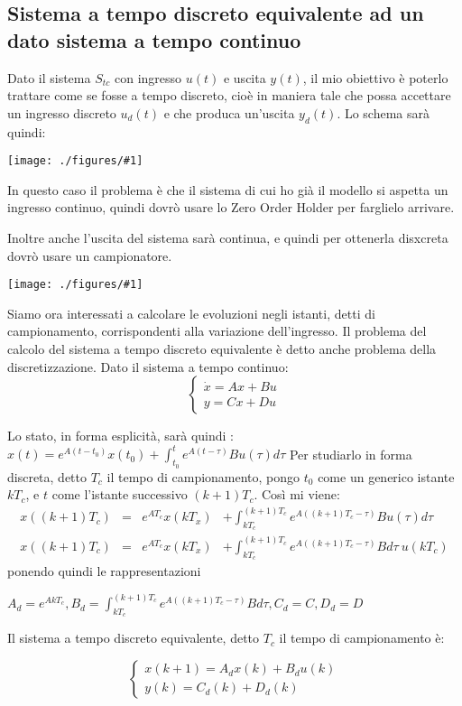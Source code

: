 \documentclass{article}
\newcommand{\incfig}[2]{%
	\texttt{[image: ./figures/\#1]}%
}
\begin{document}
\subsection{Sistema a tempo discreto equivalente ad un dato sistema a tempo continuo}
Dato il sistema $S_{tc}$ con ingresso $u(t)$ e uscita $y(t)$, il mio obiettivo è poterlo trattare come se fosse a tempo discreto, cioè in maniera tale
che possa accettare un ingresso discreto $u_d(t)$ e che produca un'uscita $y_d(t)$.
Lo schema sarà quindi:

\incfig{ZOH.jpeg}{0.4}

In questo caso il problema è che il sistema di cui ho già il modello si aspetta un ingresso continuo, quindi dovrò usare lo Zero Order Holder per
farglielo arrivare.

Inoltre anche l'uscita del sistema sarà continua, e quindi per ottenerla disxcreta dovrò usare un campionatore.

\incfig{discreto.jpeg}{0.4}

Siamo ora interessati a calcolare le evoluzioni negli istanti, detti di campionamento, corrispondenti alla variazione dell'ingresso.
Il problema del calcolo del sistema a tempo discreto equivalente è detto anche problema della discretizzazione. Dato il sistema a tempo continuo:
\[
\begin{cases}
    \dot{x} = Ax+Bu\\
    y = Cx+Du
\end{cases}
\]

Lo stato, in forma esplicità, sarà quindi : \(\displaystyle x(t) = e^{A(t-t_0)}x(t_0) + \int_{t_0}^{t} e^{A(t-\tau)}Bu(\tau)d\tau\)
Per studiarlo in forma discreta, detto $T_c$ il tempo di campionamento, pongo $t_0$ come un generico istante $kT_c$, e $t$ come l'istante successivo
$(k+1)T_c$. Così mi viene:
\begin{align*} 
    x((k+1)T_c) &=& e^{AT_c}x(kT_x) &+ \int_{kT_c}^{(k+1)T_c} e ^{A((k+1)T_c-\tau)}B u(\tau) d\tau \\
    x((k+1)T_c) &=& e^{AT_c}x(kT_x) &+ \int_{kT_c}^{(k+1)T_c} e ^{A((k+1)T_c-\tau)}B  d\tau \ u(kT_c)
\end{align*}
ponendo quindi le rappresentazioni 

\(\displaystyle A_d=e^{AkT_c}, B_d=\int_{kT_c}^{(k+1)T_c} e^{A((k+1)T_c-\tau)}B d\tau , C_d = C,  D_d=D\)

Il sistema a tempo discreto equivalente, detto $T_c$ il tempo di campionamento è:

\[
\begin{cases}
    x(k+1)=A_d x(k)+B_d u(k)\\
    y(k)=C_d (k) + D_d(k)
\end{cases}
\]
\end{document}
